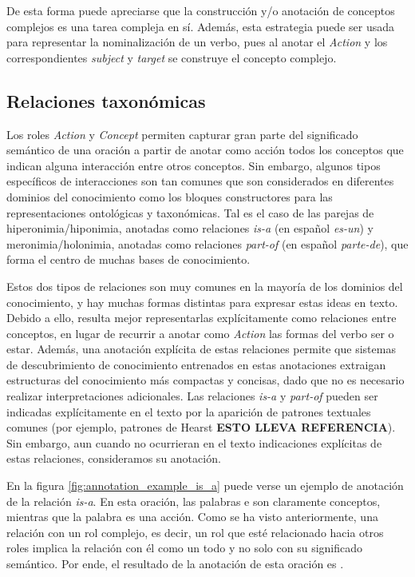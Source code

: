 De esta forma puede apreciarse que la construcción y/o anotación de conceptos complejos es una tarea compleja en sí. Además, esta estrategia puede ser usada para representar la nominalización de un verbo, pues al anotar el {\it Action} y los correspondientes {\it subject} y {\it target} se
construye el concepto complejo.

\subsection{Relaciones taxonómicas}
Los roles {\it Action} y {\it Concept} permiten capturar gran parte del significado semántico de una oración a partir de anotar como acción todos los conceptos que indican alguna interacción entre otros conceptos. Sin embargo, algunos tipos específicos de interacciones son tan comunes que son considerados en diferentes dominios del conocimiento como los bloques constructores para las representaciones ontológicas y taxonómicas. Tal es el caso de las parejas de hiperonimia/hiponimia, anotadas como relaciones {\it is-a} (en español {\it es-un}) y meronimia/holonimia, anotadas como relaciones {\it part-of} (en español {\it parte-de}), que forma el centro de muchas bases de conocimiento.

Estos dos tipos de relaciones son muy comunes en la mayoría de los dominios del conocimiento, y hay muchas formas distintas para expresar
estas ideas en texto. Debido a ello, resulta mejor representarlas explícitamente como relaciones entre conceptos, en lugar de recurrir a anotar como {\it Action} las formas del verbo ser o estar. Además, una anotación explícita de estas relaciones permite que sistemas de descubrimiento de conocimiento entrenados en estas anotaciones extraigan estructuras del conocimiento más compactas y concisas, dado que no es necesario realizar interpretaciones adicionales. Las relaciones {\it is-a} y {\it part-of} pueden ser indicadas explícitamente en el texto por la aparición de patrones textuales comunes (por ejemplo, patrones de Hearst \textbf{ESTO LLEVA REFERENCIA}). Sin embargo, aun cuando no ocurrieran en el texto indicaciones explícitas de estas relaciones, consideramos su anotación.

En la figura \ref{fig:annotation_example_is_a} puede verse un ejemplo de anotación de la relación {\it is-a}. En esta oración, las palabras  e  son claramente conceptos, mientras que la palabra  es una acción. Como se ha visto anteriormente, una relación con un rol complejo, es decir, un rol que esté relacionado hacia otros roles implica la relación con él como un todo y no solo con su significado semántico. Por ende, el resultado de la anotación de esta oración es .

